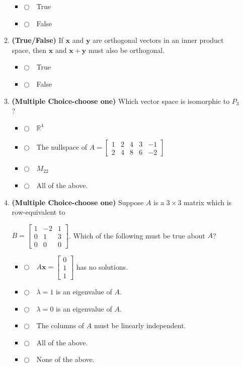 \documentclass[12pt]{extarticle}
\newcommand{\chooseone}{{\Large$\Circle$\ \ }}
\begin{document}
\begin{enumerate}
\begin{enumerate}[label=\alph*.]
\begin{itemize}[label={}]
\item \chooseone True
\item \chooseone False
\end{itemize}
\vfill


\item  \textbf{(True/False)} If $\mathbf{x}$ and $\mathbf{y}$ are orthogonal vectors in an inner product space, then $\mathbf{x}$ and $\mathbf{x}+\mathbf{y}$ must also be orthogonal.
\begin{itemize}[label={}]
\item \chooseone True
\item \chooseone False
\end{itemize}

\vfill


\item \textbf{(Multiple Choice-choose one)} Which vector space is isomorphic to $P_3$?
\begin{itemize}[label={}]
\item \chooseone $\mathbb{R}^4$\medskip
\item \chooseone The nullspace of $A=\begin{bmatrix} 1 & 2 & 4 & 3 & -1\\2 & 4 & 8 & 6 & -2\end{bmatrix}$\medskip
\item \chooseone $M_{22}$\medskip
\item \chooseone All of the above.
\end{itemize}
\vfill

\newpage


\item \textbf{(Multiple Choice-choose one)} Suppose $A$ is a $3\times 3$ matrix which is row-equivalent to 

$B=\begin{bmatrix} 1 & -2 & 1\\ 0 & 1 & 3\\ 0 & 0 & 0\end{bmatrix}$. Which of the following must be true about $A$?
\begin{itemize}[label={}]
\item \chooseone $A\mathbf{x}=\begin{bmatrix} 0 \\ 1 \\1\end{bmatrix}$ has no solutions.\medskip
\item \chooseone $\lambda=1$ is an eigenvalue of $A$. \medskip
\item \chooseone $\lambda=0$ is an eigenvalue of $A$. \medskip
\item \chooseone The columns of $A$ must be linearly independent.
\item \chooseone All of the above.
\item \chooseone None of the above.
\end{itemize}


\end{enumerate}
\end{enumerate}
\end{document}
